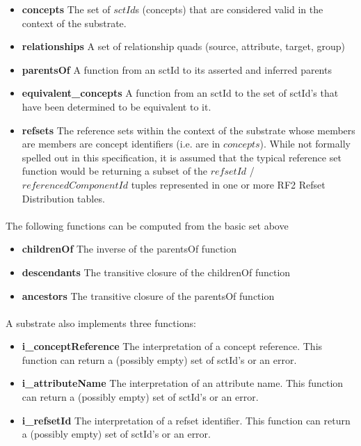 \documentclass{article}
\begin{document}
\begin{itemize}[noitemsep,nolistsep]
\item{\textbf{concepts}} The set of $sctId$s (concepts) that are considered valid in the context of the substrate.  
\item{\textbf{relationships}} A set of relationship quads (source, attribute, target, group)
\item{\textbf{parentsOf}}  A function from an sctId to its asserted and inferred parents
\item{\textbf{equivalent\_concepts}} A function from an sctId to the set of sctId's that have been determined to be equivalent to it. 
 \item{\textbf{refsets}} The reference sets within the context of the substrate whose members are members are concept identifiers (i.e. are in $concepts$).  While not formally spelled out in this specification, it is assumed that the typical reference set function would be returning a subset of the $refsetId$ / $referencedComponentId$ tuples represented in one or more RF2 Refset Distribution tables.
\end{itemize}
\paragraph{}

The following functions can be computed from the basic set above
\begin{itemize}[noitemsep,nolistsep]
\item{\textbf{childrenOf}} The inverse of the parentsOf function
\item{\textbf{descendants}} The transitive closure of the childrenOf function
\item{\textbf{ancestors}} The transitive closure of the parentsOf function
\end{itemize}

\paragraph{}

A substrate also implements three functions:
\begin{itemize}[noitemsep,nolistsep]
\item{\textbf{i\_conceptReference}} The interpretation of a concept reference.  This function can return a (possibly empty) set of sctId's or an error.
\item{\textbf{i\_attributeName}} The interpretation of an attribute name.  This function can return a (possibly empty) set of sctId's or an error.
\item{\textbf{i\_refsetId}} The interpretation of a refset identifier.  This function can return a (possibly empty) set of sctId's or an error.
\end{itemize}
\end{document}
